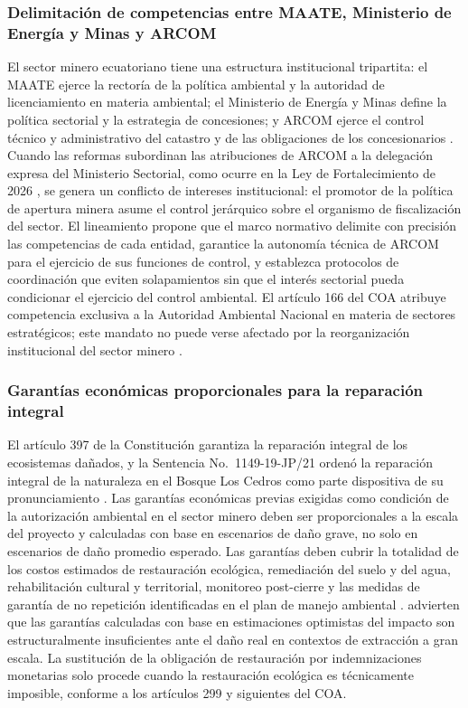 \subsubsection{Delimitación de competencias entre MAATE, Ministerio de Energía y Minas y ARCOM}

El sector minero ecuatoriano tiene una estructura institucional tripartita: el MAATE ejerce la rectoría de la política ambiental y la autoridad de licenciamiento en materia ambiental; el Ministerio de Energía y Minas define la política sectorial y la estrategia de concesiones; y ARCOM ejerce el control técnico y administrativo del catastro y de las obligaciones de los concesionarios \parencite{coa_2017,reglamento_general_ley_mineria_2009}. Cuando las reformas subordinan las atribuciones de ARCOM a la delegación expresa del Ministerio Sectorial, como ocurre en la Ley de Fortalecimiento de 2026 \parencite{ley_fortalecimiento_2026}, se genera un conflicto de intereses institucional: el promotor de la política de apertura minera asume el control jerárquico sobre el organismo de fiscalización del sector. El lineamiento propone que el marco normativo delimite con precisión las competencias de cada entidad, garantice la autonomía técnica de ARCOM para el ejercicio de sus funciones de control, y establezca protocolos de coordinación que eviten solapamientos sin que el interés sectorial pueda condicionar el ejercicio del control ambiental. El artículo 166 del COA atribuye competencia exclusiva a la Autoridad Ambiental Nacional en materia de sectores estratégicos; este mandato no puede verse afectado por la reorganización institucional del sector minero \parencite{coa_2017}.

\subsubsection{Garantías económicas proporcionales para la reparación integral}

El artículo 397 de la Constitución garantiza la reparación integral de los ecosistemas dañados, y la Sentencia No.\ 1149-19-JP/21 ordenó la reparación integral de la naturaleza en el Bosque Los Cedros como parte dispositiva de su pronunciamiento \parencite{cre_2008,cce_1149_19_jp_21}. Las garantías económicas previas exigidas como condición de la autorización ambiental en el sector minero deben ser proporcionales a la escala del proyecto y calculadas con base en escenarios de daño grave, no solo en escenarios de daño promedio esperado. Las garantías deben cubrir la totalidad de los costos estimados de restauración ecológica, remediación del suelo y del agua, rehabilitación cultural y territorial, monitoreo post-cierre y las medidas de garantía de no repetición identificadas en el plan de manejo ambiental \parencite{coa_2017}. \textcite{yanez_cevallos_2022} advierten que las garantías calculadas con base en estimaciones optimistas del impacto son estructuralmente insuficientes ante el daño real en contextos de extracción a gran escala. La sustitución de la obligación de restauración por indemnizaciones monetarias solo procede cuando la restauración ecológica es técnicamente imposible, conforme a los artículos 299 y siguientes del COA.

